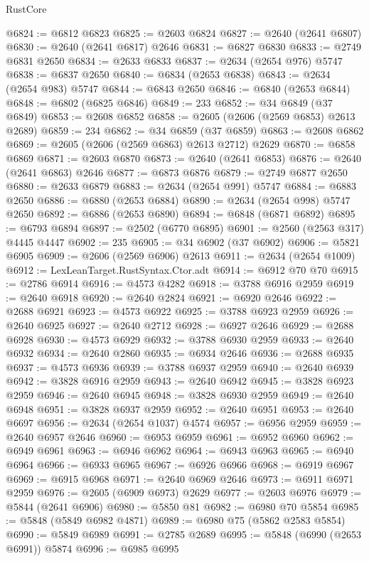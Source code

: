 \begin{lexlean}{RustCore}
\begin{coremodule}
@6824 := @6812 @6823
@6825 := @2603 @6824
@6827 := @2640 (@2641 @6807)
@6830 := @2640 (@2641 @6817) @2646
@6831 := @6827 @6830
@6833 := @2749 @6831 @2650
@6834 := @2633 @6833
@6837 := @2634 (@2654 @976) @5747
@6838 := @6837 @2650
@6840 := @6834 (@2653 @6838)
@6843 := @2634 (@2654 @983) @5747
@6844 := @6843 @2650
@6846 := @6840 (@2653 @6844)
@6848 := @6802 (@6825 @6846)
@6849 := 233
@6852 := @34 @6849 (@37 @6849)
@6853 := @2608 @6852
@6858 := @2605 (@2606 (@2569 @6853) @2613 @2689)
@6859 := 234
@6862 := @34 @6859 (@37 @6859)
@6863 := @2608 @6862
@6869 := @2605 (@2606 (@2569 @6863) @2613 @2712) @2629
@6870 := @6858 @6869
@6871 := @2603 @6870
@6873 := @2640 (@2641 @6853)
@6876 := @2640 (@2641 @6863) @2646
@6877 := @6873 @6876
@6879 := @2749 @6877 @2650
@6880 := @2633 @6879
@6883 := @2634 (@2654 @991) @5747
@6884 := @6883 @2650
@6886 := @6880 (@2653 @6884)
@6890 := @2634 (@2654 @998) @5747 @2650
@6892 := @6886 (@2653 @6890)
@6894 := @6848 (@6871 @6892)
@6895 := @6793 @6894
@6897 := @2502 (@6770 @6895)
@6901 := @2560 (@2563 @317) @4445 @4447
@6902 := 235
@6905 := @34 @6902 (@37 @6902)
@6906 := @5821 @6905
@6909 := @2606 (@2569 @6906) @2613
@6911 := @2634 (@2654 @1009)
@6912 := LexLeanTarget.RustSyntax.Ctor.adt
@6914 := @6912 @70 @70
@6915 := @2786 @6914
@6916 := @4573 @4282
@6918 := @3788 @6916 @2959
@6919 := @2640 @6918
@6920 := @2640 @2824
@6921 := @6920 @2646
@6922 := @2688 @6921
@6923 := @4573 @6922
@6925 := @3788 @6923 @2959
@6926 := @2640 @6925
@6927 := @2640 @2712
@6928 := @6927 @2646
@6929 := @2688 @6928
@6930 := @4573 @6929
@6932 := @3788 @6930 @2959
@6933 := @2640 @6932
@6934 := @2640 @2860
@6935 := @6934 @2646
@6936 := @2688 @6935
@6937 := @4573 @6936
@6939 := @3788 @6937 @2959
@6940 := @2640 @6939
@6942 := @3828 @6916 @2959
@6943 := @2640 @6942
@6945 := @3828 @6923 @2959
@6946 := @2640 @6945
@6948 := @3828 @6930 @2959
@6949 := @2640 @6948
@6951 := @3828 @6937 @2959
@6952 := @2640 @6951
@6953 := @2640 @6697
@6956 := @2634 (@2654 @1037) @4574
@6957 := @6956 @2959
@6959 := @2640 @6957 @2646
@6960 := @6953 @6959
@6961 := @6952 @6960
@6962 := @6949 @6961
@6963 := @6946 @6962
@6964 := @6943 @6963
@6965 := @6940 @6964
@6966 := @6933 @6965
@6967 := @6926 @6966
@6968 := @6919 @6967
@6969 := @6915 @6968
@6971 := @2640 @6969 @2646
@6973 := @6911 @6971 @2959
@6976 := @2605 (@6909 @6973) @2629
@6977 := @2603 @6976
@6979 := @5844 (@2641 @6906)
@6980 := @5850 @81
@6982 := @6980 @70 @5854
@6985 := @5848 (@5849 @6982 @4871)
@6989 := @6980 @75 (@5862 @2583 @5854)
@6990 := @5849 @6989
@6991 := @2785 @2689
@6995 := @5848 (@6990 (@2653 @6991)) @5874
@6996 := @6985 @6995

\end{coremodule}
\end{lexlean}
